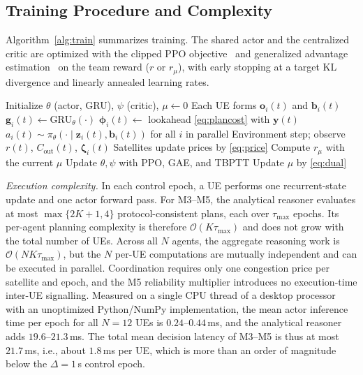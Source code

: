\documentclass[journal]{IEEEtran}
\begin{document}
\subsection{Training Procedure and Complexity}

Algorithm~\ref{alg:train} summarizes training. The shared actor and the
centralized critic are optimized with the clipped PPO
objective~\cite{schulman2017ppo} and generalized advantage
estimation~\cite{schulman2016gae} on the team reward ($r$ or $r_\mu$), with
early stopping at a target KL divergence and linearly annealed learning rates.

\begin{algorithm}[t]
\caption{Training of the capability-structured agents}
\label{alg:train}
\begin{algorithmic}[1]
\State Initialize $\theta$ (actor, GRU), $\psi$ (critic), $\mu\gets0$
    \State Each UE forms $\mathbf{o}_i(t)$ and $\mathbf{b}_i(t)$ 
    \State $\mathbf{g}_i(t)\gets\mathrm{GRU}_\theta(\cdot)$ 
    \State $\boldsymbol\phi_i(t)\gets$ lookahead \eqref{eq:plancost} with $\mathbf{y}(t)$ 
    \State $a_i(t)\sim\pi_\theta(\cdot\mid\mathbf{z}_i(t),\mathbf{b}_i(t))$ for all $i$ in parallel
    \State Environment step; observe $r(t)$, $C_{\mathrm{out}}(t)$, $\boldsymbol\zeta_i(t)$
    \State Satellites update prices by \eqref{eq:price} 
  \EndFor
  \State Compute $r_\mu$ with the current $\mu$ 
  \State Update $\theta,\psi$ with PPO, GAE, and TBPTT
  \State Update $\mu$ by \eqref{eq:dual} 
\EndFor
\end{algorithmic}
\end{algorithm}

\emph{Execution complexity.} In each control epoch, a UE performs one
recurrent-state update and one actor forward pass. For M3--M5, the analytical
reasoner evaluates at most $\max\{2K+1,4\}$ protocol-consistent plans, each
over $\tau_{\max}$ epochs. Its per-agent planning complexity is therefore
$\mathcal{O}(K\tau_{\max})$ and does not grow with the total number of UEs.
Across all $N$ agents, the aggregate reasoning work is
$\mathcal{O}(NK\tau_{\max})$, but the $N$ per-UE computations are mutually
independent and can be executed in parallel. Coordination requires only one
congestion price per satellite and epoch, and the M5 reliability multiplier
introduces no execution-time inter-UE signalling.
Measured on a single CPU thread of a desktop processor with an unoptimized
Python/NumPy implementation, the mean actor inference time per epoch for all
$N=12$ UEs is $0.24$--$0.44$\,ms, and the analytical reasoner adds
$19.6$--$21.3$\,ms. The total mean decision latency of M3--M5 is thus at
most $21.7$\,ms, i.e., about $1.8$\,ms per UE, which is more than an order of
magnitude below the $\Delta=1$\,s control epoch.
\end{document}
